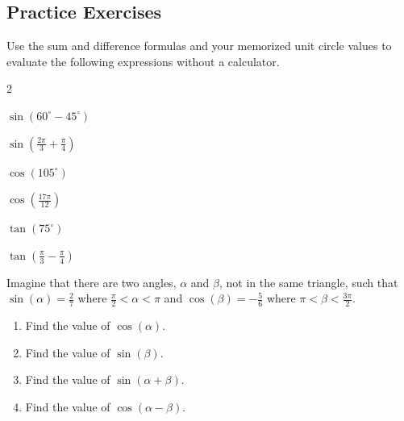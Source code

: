 \newpage

\subsection*{Practice Exercises} \label{practice-exercises-section-sum-and-difference-identities}

\begin{myPractice}
	Use the sum and difference formulas and your memorized unit circle values to evaluate the following expressions without a calculator.
	\begin{enumerate}
	\end{enumerate}
\end{myPractice}
\vspace{3cm}

\begin{myPractice}
	Imagine that there are two angles, $\alpha$ and $\beta$, not in the same triangle, such that $\sin(\alpha)=\frac{2}{7}$ where $\frac{\pi}{2}<\alpha<\pi$ and $\cos(\beta)=-\frac{5}{6}$ where $\pi<\beta<\frac{3\pi}{2}$.
	\begin{enumerate}
		\item Find the value of $\cos(\alpha)$.
		\vfill

\newpage

		\item Find the value of $\sin(\beta)$.
		\vfill
		\vfill
		\item Find the value of $\sin(\alpha+\beta)$.
		\vfill
		\item Find the value of $\cos(\alpha-\beta)$.
		\vfill
	\end{enumerate}
\end{myPractice}

